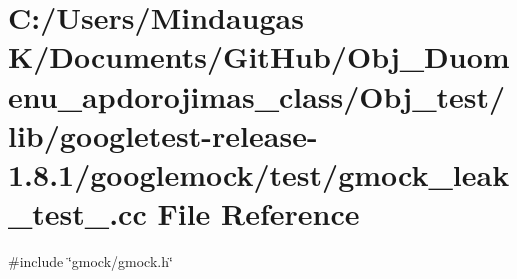 \hypertarget{_obj__test_2lib_2googletest-release-1_88_81_2googlemock_2test_2gmock__leak__test___8cc}{}\section{C\+:/\+Users/\+Mindaugas K/\+Documents/\+Git\+Hub/\+Obj\+\_\+\+Duomenu\+\_\+apdorojimas\+\_\+class/\+Obj\+\_\+test/lib/googletest-\/release-\/1.8.1/googlemock/test/gmock\+\_\+leak\+\_\+test\+\_\+.cc File Reference}
\label{_obj__test_2lib_2googletest-release-1_88_81_2googlemock_2test_2gmock__leak__test___8cc}
{\ttfamily \#include \char`\"{}gmock/gmock.\+h\char`\"{}}\newline
